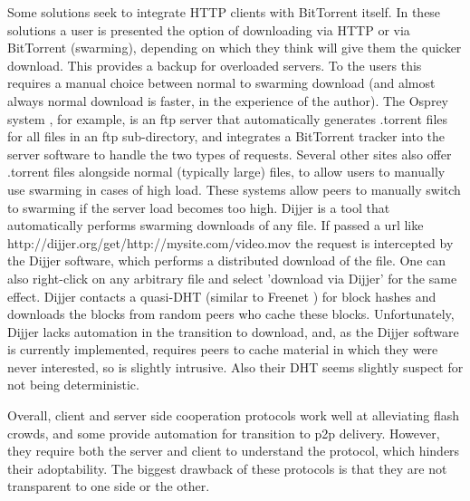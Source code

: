 Some solutions seek to integrate HTTP clients with BitTorrent itself.  In these solutions a user is presented the option of downloading via HTTP or via BitTorrent (swarming), depending on which they think will give them the quicker download.  This provides a backup for overloaded servers.  To the users this requires a manual choice between normal to swarming download (and almost always normal download is faster, in the experience of the author).  The Osprey system \cite{osprey}, for example, is an ftp server that automatically generates .torrent files for all files in an ftp sub-directory, and integrates a BitTorrent tracker into the server software to handle the two types of requests.  Several other sites also offer .torrent files alongside normal (typically large) files, to allow users to manually use swarming in cases of high load.  These systems allow peers to manually switch to swarming if the server load becomes too high.  Dijjer \cite{dijjer} is a tool that automatically performs swarming downloads of any file.  If passed a url like http://dijjer.org/get/http://mysite.com/video.mov the request is intercepted by the Dijjer software, which performs a distributed download of the file.  One can also right-click on any arbitrary file and select 'download via Dijjer' for the same effect.  Dijjer contacts a quasi-DHT (similar to Freenet \cite{freenet}) for block hashes and downloads the blocks from random peers who cache these blocks.  Unfortunately, Dijjer lacks automation in the transition to download, and, as the Dijjer software is currently implemented, requires peers to cache material in which they were never interested, so is slightly intrusive.  Also their DHT seems slightly suspect for not being deterministic.  

Overall, client and server side cooperation protocols work well at alleviating flash crowds, and some provide automation for transition to p2p delivery.  However, they require both the server and client to understand the protocol, which hinders their adoptability.  The biggest drawback of these protocols is that they are not transparent to one side or the other.

